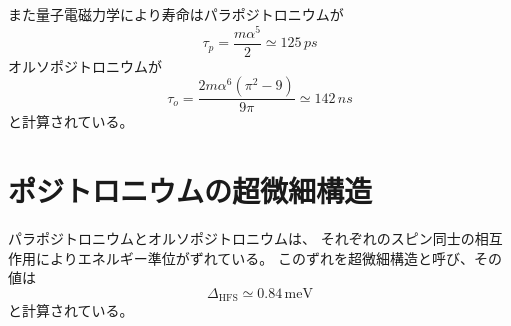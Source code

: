 また量子電磁力学により寿命はパラポジトロニウムが
\begin{equation}
	\nonumber
\tau_{p} = \frac{m \alpha^{5}}{2} \simeq 125 \, \si{ps}
\end{equation}
オルソポジトロニウムが
\begin{equation}
	\nonumber
\tau_{o} = \frac{2m \alpha^{6}(\pi^{2}-9)}{9 \pi} \simeq 142 \, \si{ns}
\end{equation}
と計算されている。


\section{ポジトロニウムの超微細構造}

パラポジトロニウムとオルソポジトロニウムは、
それぞれのスピン同士の相互作用によりエネルギー準位がずれている。
このずれを超微細構造と呼び、その値は
\begin{equation}
	\nonumber
\Delta_{\mathrm{HFS}} \simeq 0.84 \, \mathrm{meV}
\end{equation}
と計算されている。


